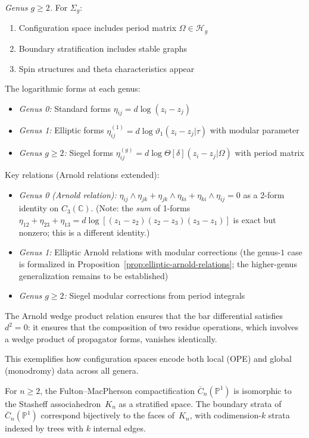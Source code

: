 \begin{example}
\emph{Genus $g \geq 2$.} For $\Sigma_g$:
\begin{enumerate}
\item Configuration space includes period matrix $\Omega \in \mathcal{H}_g$
\item Boundary stratification includes stable graphs
\item Spin structures and theta characteristics appear
\end{enumerate}

The logarithmic forms at each genus:
\begin{itemize}
\item \emph{Genus 0:} Standard forms $\eta_{ij} = d\log(z_i - z_j)$
\item \emph{Genus 1:} Elliptic forms $\eta_{ij}^{(1)} = d\log\vartheta_1(z_i - z_j|\tau)$ with modular parameter
\item \emph{Genus $g \geq 2$:} Siegel forms $\eta_{ij}^{(g)} = d\log\Theta[\delta](z_i - z_j|\Omega)$ with period matrix
\end{itemize}

Key relations (Arnold relations extended):
\begin{itemize}
\item \emph{Genus 0 (Arnold relation):}
$\eta_{ij} \wedge \eta_{jk} + \eta_{jk} \wedge \eta_{ki} + \eta_{ki} \wedge \eta_{ij} = 0$
as a 2-form identity on $C_3(\mathbb{C})$. (Note: the \emph{sum} of 1-forms
$\eta_{12} + \eta_{23} + \eta_{13} = d\log[(z_1{-}z_2)(z_2{-}z_3)(z_3{-}z_1)]$
is exact but nonzero; this is a different identity.)
\item \emph{Genus 1:} Elliptic Arnold relations with modular corrections (the genus-$1$ case is formalized in Proposition~\ref{prop:elliptic-arnold-relations}; the higher-genus generalization remains to be established)
\item \emph{Genus $g \geq 2$:} Siegel modular corrections from period integrals
\end{itemize}

The Arnold wedge product relation ensures that the bar differential satisfies
$d^2 = 0$: it ensures that the composition of two residue operations, which involves
a wedge product of propagator forms, vanishes identically.

This exemplifies how configuration spaces encode both local (OPE) and global (monodromy) data across all genera.
\end{example}

\begin{theorem}\label{thm:fm-associahedron}
For $n \geq 2$, the Fulton--MacPherson compactification $\overline{C}_n(\mathbb{P}^1)$ is isomorphic to the Stasheff associahedron~$K_n$ as a stratified space.  The boundary strata of $\overline{C}_n(\mathbb{P}^1)$ correspond bijectively to the faces of~$K_n$, with codimension-$k$ strata indexed by trees with $k$ internal edges.
\end{theorem}

